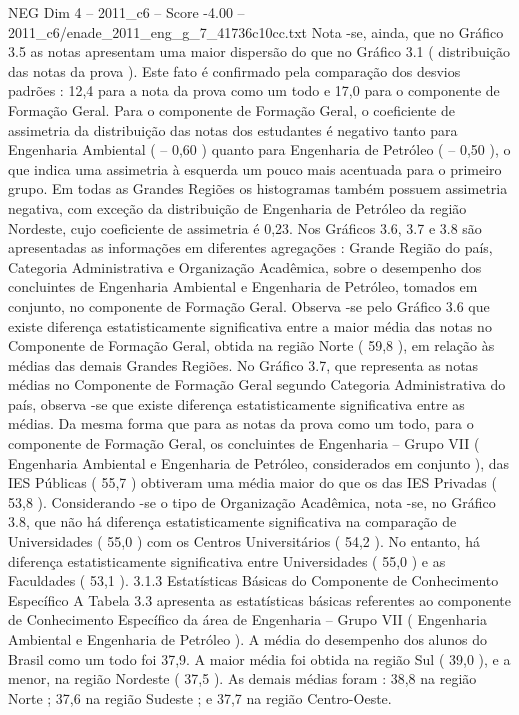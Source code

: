 \begin{textsample}{NEG Dim 4 – 2011\_c6 – Score -4.00 – 2011\_c6/enade\_2011\_eng\_g\_7\_41736c10cc.txt}
Nota -se, ainda, que no Gráfico 3.5 as notas apresentam uma maior dispersão do que no Gráfico 3.1 ( distribuição das notas da prova ).
Este fato é confirmado pela comparação dos desvios padrões : 12,4 para a nota da prova como um todo e 17,0 para o componente de Formação Geral.
Para o componente de Formação Geral, o coeficiente de assimetria da distribuição das notas dos estudantes é negativo tanto para Engenharia Ambiental ( – 0,60 ) quanto para Engenharia de Petróleo ( – 0,50 ), o que indica uma assimetria à esquerda um pouco mais acentuada para o primeiro grupo.
Em todas as Grandes Regiões os histogramas também possuem assimetria negativa, com exceção da distribuição de Engenharia de Petróleo da região Nordeste, cujo coeficiente de assimetria é 0,23.
Nos Gráficos 3.6, 3.7 e 3.8 são apresentadas as informações em diferentes agregações : Grande Região do país, Categoria Administrativa e Organização Acadêmica, sobre o desempenho dos concluintes de Engenharia Ambiental e Engenharia de Petróleo, tomados em conjunto, no componente de Formação Geral.
Observa -se pelo Gráfico 3.6 que existe diferença estatisticamente significativa entre a maior média das notas no Componente de Formação Geral, obtida na região Norte ( 59,8 ), em relação às médias das demais Grandes Regiões.
No Gráfico 3.7, que representa as notas médias no Componente de Formação Geral segundo Categoria Administrativa do país, observa -se que existe diferença estatisticamente significativa entre as médias.
Da mesma forma que para as notas da prova como um todo, para o componente de Formação Geral, os concluintes de Engenharia – Grupo VII ( Engenharia Ambiental e Engenharia de Petróleo, considerados em conjunto ), das IES Públicas ( 55,7 ) obtiveram uma média maior do que os das IES Privadas ( 53,8 ).
Considerando -se o tipo de Organização Acadêmica, nota -se, no Gráfico 3.8, que não há diferença estatisticamente significativa na comparação de Universidades ( 55,0 ) com os Centros Universitários ( 54,2 ).
No entanto, há diferença estatisticamente significativa entre Universidades ( 55,0 ) e as Faculdades ( 53,1 ). 3.1.3 Estatísticas Básicas do Componente de Conhecimento Específico A Tabela 3.3 apresenta as estatísticas básicas referentes ao componente de Conhecimento Específico da área de Engenharia – Grupo VII ( Engenharia Ambiental e Engenharia de Petróleo ).
A média do desempenho dos alunos do Brasil como um todo foi 37,9.
A maior média foi obtida na região Sul ( 39,0 ), e a menor, na região Nordeste ( 37,5 ).
As demais médias foram : 38,8 na região Norte ; 37,6 na região Sudeste ; e 37,7 na região Centro-Oeste.

\end{textsample}
